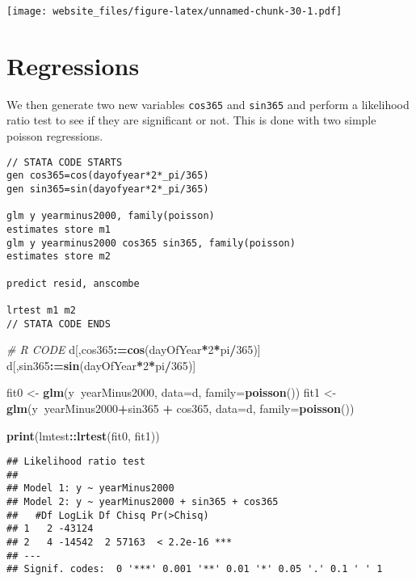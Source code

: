 \documentclass[]{book}
\newenvironment{Shaded}{\begin{snugshade}}{\end{snugshade}}
\newcommand{\KeywordTok}[1]{\textcolor[rgb]{0.13,0.29,0.53}{\textbf{#1}}}
\newcommand{\DataTypeTok}[1]{\textcolor[rgb]{0.13,0.29,0.53}{#1}}
\newcommand{\DecValTok}[1]{\textcolor[rgb]{0.00,0.00,0.81}{#1}}
\newcommand{\StringTok}[1]{\textcolor[rgb]{0.31,0.60,0.02}{#1}}
\newcommand{\CommentTok}[1]{\textcolor[rgb]{0.56,0.35,0.01}{\textit{#1}}}
\newcommand{\OperatorTok}[1]{\textcolor[rgb]{0.81,0.36,0.00}{\textbf{#1}}}
\newcommand{\ErrorTok}[1]{\textcolor[rgb]{0.64,0.00,0.00}{\textbf{#1}}}
\newcommand{\NormalTok}[1]{#1}
\begin{document}
\texttt{[image: website\_files/figure-latex/unnamed-chunk-30-1.pdf]}

\newpage

\section{Regressions}\label{regressions}

We then generate two new variables \texttt{cos365} and \texttt{sin365}
and perform a likelihood ratio test to see if they are significant or
not. This is done with two simple poisson regressions.

\begin{verbatim}
// STATA CODE STARTS
gen cos365=cos(dayofyear*2*_pi/365)
gen sin365=sin(dayofyear*2*_pi/365)

glm y yearminus2000, family(poisson)
estimates store m1
glm y yearminus2000 cos365 sin365, family(poisson)
estimates store m2

predict resid, anscombe

lrtest m1 m2
// STATA CODE ENDS
\end{verbatim}

\begin{Shaded}
\begin{Highlighting}[]
\CommentTok{# R CODE}
\NormalTok{d[,cos365}\OperatorTok{:}\ErrorTok{=}\KeywordTok{cos}\NormalTok{(dayOfYear}\OperatorTok{*}\DecValTok{2}\OperatorTok{*}\NormalTok{pi}\OperatorTok{/}\DecValTok{365}\NormalTok{)]}
\NormalTok{d[,sin365}\OperatorTok{:}\ErrorTok{=}\KeywordTok{sin}\NormalTok{(dayOfYear}\OperatorTok{*}\DecValTok{2}\OperatorTok{*}\NormalTok{pi}\OperatorTok{/}\DecValTok{365}\NormalTok{)]}

\NormalTok{fit0 <-}\StringTok{ }\KeywordTok{glm}\NormalTok{(y}\OperatorTok{~}\NormalTok{yearMinus2000, }\DataTypeTok{data=}\NormalTok{d, }\DataTypeTok{family=}\KeywordTok{poisson}\NormalTok{())}
\NormalTok{fit1 <-}\StringTok{ }\KeywordTok{glm}\NormalTok{(y}\OperatorTok{~}\NormalTok{yearMinus2000}\OperatorTok{+}\NormalTok{sin365 }\OperatorTok{+}\StringTok{ }\NormalTok{cos365, }\DataTypeTok{data=}\NormalTok{d, }\DataTypeTok{family=}\KeywordTok{poisson}\NormalTok{())}

\KeywordTok{print}\NormalTok{(lmtest}\OperatorTok{::}\KeywordTok{lrtest}\NormalTok{(fit0, fit1))}
\end{Highlighting}
\end{Shaded}

\begin{verbatim}
## Likelihood ratio test
## 
## Model 1: y ~ yearMinus2000
## Model 2: y ~ yearMinus2000 + sin365 + cos365
##   #Df LogLik Df Chisq Pr(>Chisq)    
## 1   2 -43124                        
## 2   4 -14542  2 57163  < 2.2e-16 ***
## ---
## Signif. codes:  0 '***' 0.001 '**' 0.01 '*' 0.05 '.' 0.1 ' ' 1
\end{verbatim}
\end{document}
